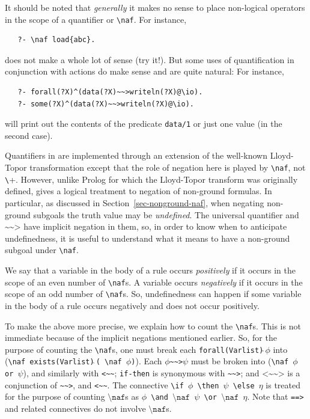 \documentclass[11pt]{article}
\newcommand{\ERGO}{\mbox{\smaller{\ensuremath{\cal{E}}\smaller{{\sc{RGO}}}}}\xspace}
\newcommand{\FLSYSTEM}{\ERGO}
\newcommand{\rnafarr}{\texttt{\textasciitilde\textasciitilde>}}
\newcommand{\lnafarr}{\texttt{<\textasciitilde\textasciitilde}}
\newcommand{\rlnafarr}{\texttt{<\textasciitilde\textasciitilde>}}
\newcommand{\bs}{\textbackslash}
\newcommand{\PLGNAF}{\mbox{\texttt{\bs}+}\xspace}
\newcommand{\RULELOGNAF}{{\texttt{{\bs}naf}}\xspace}
\begin{document}
It should be noted that \emph{generally}   it makes no
sense to place non-logical operators in the scope of a quantifier or
\texttt{\RULELOGNAF}. For instance,
\begin{verbatim}
   ?- \naf load{abc}.
\end{verbatim}
does not make a whole lot of sense (try it!). But some uses of
quantification in conjunction with actions do make sense and are quite natural:
For instance,
\begin{verbatim}
   ?- forall(?X)^(data(?X)~~>writeln(?X)@\io).
   ?- some(?X)^(data(?X)~~>writeln(?X)@\io).
\end{verbatim}
will print out the contents of the predicate \texttt{data/1} or just one
value (in the second case).

Quantifiers in \FLSYSTEM are implemented through an extension of
the well-known Lloyd-Topor
transformation \cite{Lloy84} except that the role of negation here is
played by \texttt{\RULELOGNAF}, not \PLGNAF. However, unlike Prolog for which the
Lloyd-Topor transform was originally defined, \FLSYSTEM gives a
logical treatment to negation of non-ground formulas. In particular, as
discussed in Section~\ref{sec-nonground-naf}, when
negating non-ground subgoals the truth value may be \emph{undefined}.
The universal quantifier and $\rnafarr$ have implicit negation in them, so, in order to
know when to anticipate undefinedness, it is useful
to understand what it means to have a non-ground subgoal under
\texttt{\RULELOGNAF}. 

We say that a variable in the body of a rule occurs \emph{positively} if it
occurs in the scope of an even number of  \texttt{\RULELOGNAF}s. A variable occurs
\emph{negatively} if it occurs in the scope of an odd number of
\texttt{\RULELOGNAF}s.  
So, undefinedness can happen if some variable in the body of a rule occurs
negatively and does not occur positively.

To make the above more precise, we explain how to count the \texttt{\RULELOGNAF}s. This is
not immediate because of the implicit negations mentioned earlier.
So, for the purpose of counting the \texttt{\RULELOGNAF}s, one must break
each \texttt{forall(Varlist)$\widehat{\ }\phi$}  into
(\texttt{\RULELOGNAF\,exists(Varlist)$\widehat{\ }$( \RULELOGNAF\,$\phi$)}). Each
$\phi$\rnafarr$\psi$ must be
broken into  (\texttt{\RULELOGNAF\,$\phi$ or $\psi$}), and similarly with
\lnafarr;
\texttt{if-then} is synonymous with \rnafarr; and   $\rlnafarr$
is a conjunction of \rnafarr, and \lnafarr. The connective
\texttt{\bs{}if\,$\phi$\,\bs{}then\,$\psi$\,\bs{}else\,$\eta$}
is treated for the purpose of
counting $\RULELOGNAF$s as
\texttt{$\phi$\,\bs{}and\,$\RULELOGNAF$\,$\psi$\,\bs{}or\,$\RULELOGNAF$\,$\eta$}.  Note that \texttt{==>} and related
connectives do not involve $\RULELOGNAF$s.
\end{document}
